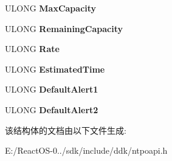 \begin{DoxyCompactItemize}
U\+L\+O\+NG {\bfseries Max\+Capacity}
\item 
\mbox{\label{struct_s_y_s_t_e_m___b_a_t_t_e_r_y___s_t_a_t_e_a01a7c0affae7e79f7100578307739e7b}} 
U\+L\+O\+NG {\bfseries Remaining\+Capacity}
\item 
\mbox{\label{struct_s_y_s_t_e_m___b_a_t_t_e_r_y___s_t_a_t_e_a7703879f83c404c285f743ae739ee436}} 
U\+L\+O\+NG {\bfseries Rate}
\item 
\mbox{\label{struct_s_y_s_t_e_m___b_a_t_t_e_r_y___s_t_a_t_e_ac2b7b85f1a7c48efc8af33ecc9820077}} 
U\+L\+O\+NG {\bfseries Estimated\+Time}
\item 
\mbox{\label{struct_s_y_s_t_e_m___b_a_t_t_e_r_y___s_t_a_t_e_a4471b6846d6a945b1b54cf65438b7d26}} 
U\+L\+O\+NG {\bfseries Default\+Alert1}
\item 
\mbox{\label{struct_s_y_s_t_e_m___b_a_t_t_e_r_y___s_t_a_t_e_ab36a4ec14ae3942134de6c4e04a18415}} 
U\+L\+O\+NG {\bfseries Default\+Alert2}
\end{DoxyCompactItemize}


该结构体的文档由以下文件生成\+:\begin{DoxyCompactItemize}
\item 
E\+:/\+React\+O\+S-\/0../sdk/include/ddk/ntpoapi.\+h\end{DoxyCompactItemize}
